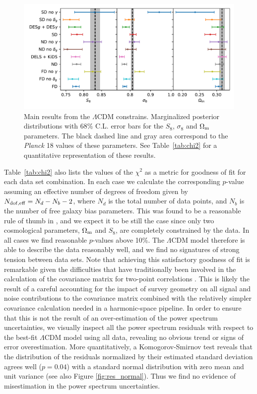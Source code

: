 \documentclass[a4paper,11pt]{article}
\newcommand{\Om}{\Omega_{\rm m}}
\newcommand{\lcdm}{$\Lambda$CDM\xspace}
\newcommand{\planck}{{\sl Planck}\xspace}
\begin{document}
      \begin{figure}
          \centering
          \includegraphics[width=\textwidth]{figures/lcdm_results.pdf}
          \caption{Main results from the \lcdm constrains. Marginalized posterior distributions with 68\% C.L. error bars for the $S_8$, $\sigma_8$ and $\Om$ parameters. The black dashed line and gray area correspond to the \planck 18 values of these parameters. See Table~\ref{tab:chi2} for a quantitative representation of these results. }
          \label{fig:lcdm_results}
      \end{figure}


      Table~\ref{tab:chi2} also lists the values of the $\chi^2$ as a metric for goodness of fit for each data set combination. In each case we calculate the corresponding $p$-value assuming an effective number of degrees of freedom given by $N_{\rm dof,eff}=N_d-N_b-2$, where $N_d$ is the total number of data points, and $N_b$ is the number of free galaxy bias parameters. This was found to be a reasonable rule of thumb in \cite{2103.09820}, and we expect it to be still the case since only two cosmological parameters, $\Om$ and $S_8$, are completely constrained by the data.  In all cases we find reasonable $p$-values above 10\%. The \lcdm model therefore is able to describe the data reasonably well, and we find no signatures of strong tension between data sets. Note that achieving this satisfactory goodness of fit is remarkable given the difficulties that have traditionally been involved in the calculation of the covariance matrix for two-point correlations \citep{1708.01530,1804.10663,2007.15633,2012.08568}. This is likely the result of a careful accounting for the impact of survey geometry on all signal and noise contributions to the covariance matrix combined with the relatively simpler covariance calculation needed in a harmonic-space pipeline. In order to ensure that this is not the result of an over-estimation of the power spectrum uncertainties, we visually inspect all the power spectrum residuals with respect to the best-fit \lcdm model using all data, revealing no obvious trend or signs of error overestimation. More quantitatively, a Komogorov-Smirnov test reveals that the distribution of the residuals normalized by their estimated standard deviation agrees well ($p = 0.04$) with a standard normal distribution with zero mean and unit variance (see also Figure \ref{fig:res_normal}). Thus we find no evidence of misestimation in the power spectrum uncertainties.
\end{document}
